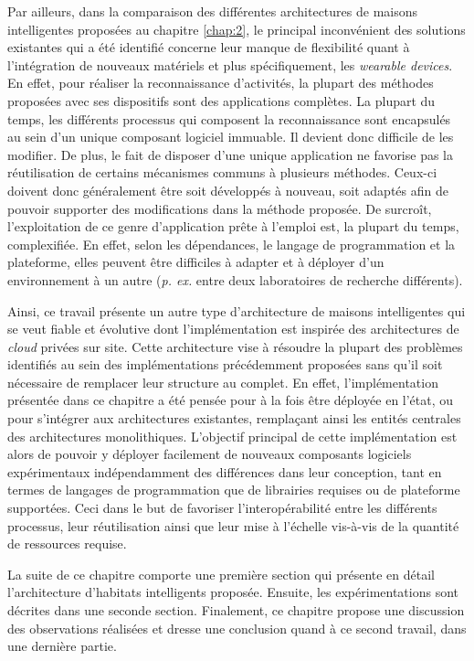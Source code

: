 Par ailleurs, dans la comparaison des différentes architectures de maisons intelligentes proposées au chapitre \ref{chap:2}, le principal inconvénient des solutions existantes qui a été identifié concerne leur manque de flexibilité quant à l'intégration de nouveaux matériels et plus spécifiquement, les \textit{wearable devices}. En effet, pour réaliser la reconnaissance d'activités, la plupart des méthodes proposées avec ses dispositifs sont des applications complètes. La plupart du temps, les différents processus qui composent la reconnaissance sont encapsulés au sein d'un unique composant logiciel immuable. Il devient donc difficile de les modifier. De plus, le fait de disposer d'une unique application ne favorise pas la réutilisation de certains mécanismes communs à plusieurs méthodes. Ceux-ci doivent donc généralement être soit développés à nouveau, soit adaptés afin de pouvoir supporter des modifications dans la méthode proposée. De surcroît, l'exploitation de ce genre d'application \og prête à l'emploi \fg est, la plupart du temps, complexifiée. En effet, selon les dépendances, le langage de programmation et la plateforme, elles peuvent être difficiles à adapter et à déployer d'un environnement à un autre (\textit{p. ex.} entre deux laboratoires de recherche différents).

Ainsi, ce travail présente un autre type d'architecture de maisons intelligentes qui se veut fiable et évolutive dont l'implémentation est inspirée des architectures de \textit{cloud} privées sur site. Cette architecture vise à résoudre la plupart des problèmes identifiés au sein des implémentations précédemment proposées sans qu'il soit nécessaire de remplacer leur structure au complet. En effet, l'implémentation présentée dans ce chapitre a été pensée pour à la fois être déployée en l'état, ou pour s'intégrer aux architectures existantes, remplaçant ainsi les entités centrales des architectures monolithiques. L'objectif principal de cette implémentation est alors de pouvoir y déployer facilement de nouveaux composants logiciels expérimentaux indépendamment des différences dans leur conception, tant en termes de langages de programmation que de librairies requises ou de plateforme supportées. Ceci dans le but de favoriser l'interopérabilité entre les différents processus, leur réutilisation ainsi que leur mise à l'échelle vis-à-vis de la quantité de ressources requise.

La suite de ce chapitre comporte une première section qui présente en détail l'architecture d'habitats intelligents proposée. Ensuite, les expérimentations sont décrites dans une seconde section. Finalement, ce chapitre propose une discussion des observations réalisées et dresse une conclusion quand à ce second travail, dans une dernière partie.

